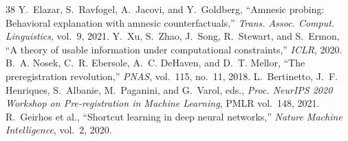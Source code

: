 \documentclass[conference]{IEEEtran}
\begin{document}
\begin{thebibliography}{38}
 Y.~Elazar, S.~Ravfogel, A.~Jacovi, and Y.~Goldberg, ``Amnesic probing:
Behavioral explanation with amnesic counterfactuals,'' \emph{Trans. Assoc. Comput.
Linguistics}, vol.~9, 2021.
 Y.~Xu, S.~Zhao, J.~Song, R.~Stewart, and S.~Ermon, ``A theory of usable
information under computational constraints,'' \emph{ICLR}, 2020.
 B.~A. Nosek, C.~R. Ebersole, A.~C. DeHaven, and D.~T. Mellor, ``The
preregistration revolution,'' \emph{PNAS}, vol.~115, no.~11, 2018.
 L.~Bertinetto, J.~F. Henriques, S.~Albanie, M.~Paganini, and
G.~Varol, eds., \emph{Proc. NeurIPS 2020 Workshop on Pre-registration in Machine
Learning}, PMLR vol.~148, 2021.
 R.~Geirhos et al., ``Shortcut learning in deep neural networks,''
\emph{Nature Machine Intelligence}, vol.~2, 2020.
\end{thebibliography}
\end{document}
